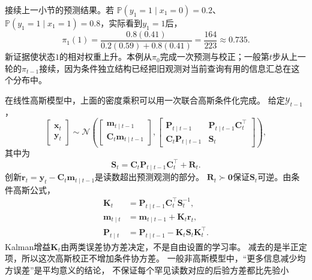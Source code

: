 \begin{example}[两状态模型的一次预测与校正]
 \label{ex:dynamical-two-state-bayes-filter}
 接续上一小节的预测结果。若
 $\mathbb P(y_1=1\mid x_1=0)=0.2$、
 $\mathbb P(y_1=1\mid x_1=1)=0.8$，实际看到$y_1=1$后，
 \[
  \pi_1(1)=\frac{0.8(0.41)}{0.2(0.59)+0.8(0.41)}
              =\frac{164}{223}\approx0.735.
 \]
 新证据使状态$1$的相对权重上升。本例从$\pi_0$完成一次预测与校正；一般第$t$步从上一轮的$\pi_{t-1}$接续，因为条件独立结构已经把旧观测对当前查询有用的信息汇总在这个分布中。
\end{example}

在线性高斯模型中，上面的密度乘积可以用一次联合高斯条件化完成。
给定$\mathcal Y_{t-1}$，
\begin{equation}
 \begin{bmatrix}\bm x_t\\\bm y_t\end{bmatrix}
 \sim\mathcal N\left(
 \begin{bmatrix}\bm m_{t\mid t-1}\\\bm C_t\bm m_{t\mid t-1}\end{bmatrix},
 \begin{bmatrix}
  \bm P_{t\mid t-1}&\bm P_{t\mid t-1}\bm C_t^\top\\
  \bm C_t\bm P_{t\mid t-1}&\bm S_t
 \end{bmatrix}\right),
 \label{eq:dynamical-kalman-joint-gaussian}
\end{equation}
其中为
\begin{equation}
 \bm S_t=\bm C_t\bm P_{t\mid t-1}\bm C_t^\top+\bm R_t.
 \label{eq:dynamical-kalman-innovation-covariance}
\end{equation}
创新$\bm r_t=\bm y_t-\bm C_t\bm m_{t\mid t-1}$是读数超出预测观测的部分。
$\bm R_t\succ\bm0$保证$\bm S_t$可逆。由条件高斯公式，
\begin{align}
 \bm K_t&=\bm P_{t\mid t-1}\bm C_t^\top\bm S_t^{-1},
       \label{eq:dynamical-kalman-gain}\\
 \bm m_{t\mid t}&=\bm m_{t\mid t-1}+\bm K_t\bm r_t,
       \label{eq:dynamical-kalman-filtered-mean}\\
 \bm P_{t\mid t}&=\bm P_{t\mid t-1}-\bm K_t\bm S_t\bm K_t^\top.
       \label{eq:dynamical-kalman-filtered-covariance}
\end{align}
Kalman增益$\bm K_t$由两类误差协方差决定，不是自由设置的学习率。
减去的是半正定项，所以这次高斯校正不增加条件协方差。
一般非高斯模型中，“更多信息减少均方误差”是平均意义的结论，
不保证每个罕见读数对应的后验方差都比先验小

